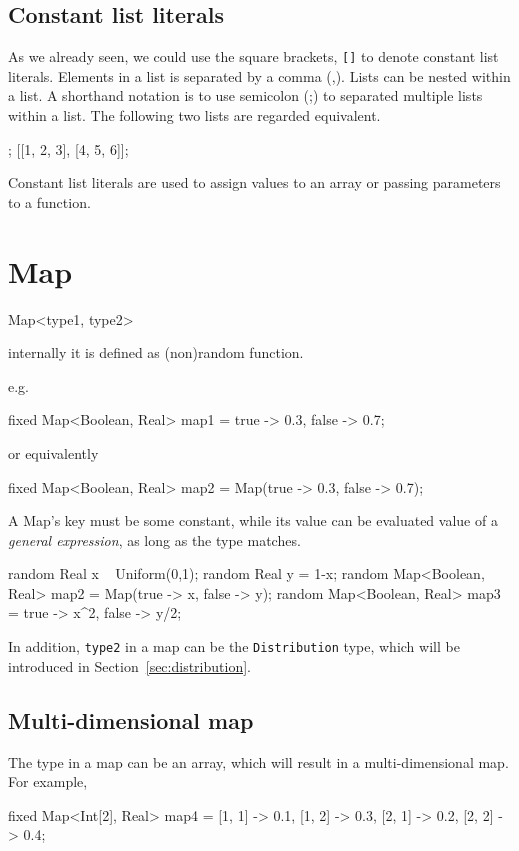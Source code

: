 \documentclass[12pt]{article}
\begin{document}
\subsection{Constant list literals}
As we already seen, we could use the square brackets, \texttt{[]} to denote constant list literals.
Elements in a list is separated by a comma (,). Lists can be nested within a list. A shorthand notation is to use semicolon (;) to separated multiple lists within a list.
The following two lists are regarded equivalent.
\begin{blog}
[1, 2, 3; 4, 5, 6];
[[1, 2, 3], [4, 5, 6]];
\end{blog}

Constant list literals are used to assign values to an array or passing parameters to a function.

\section{Map}
\begin{blog}
Map<type1, type2>
\end{blog}
internally it is defined as (non)random function.

e.g. 
\begin{blog}
fixed Map<Boolean, Real> map1 = {true -> 0.3, false -> 0.7};
\end{blog}
or equivalently 
\begin{blog}
fixed Map<Boolean, Real> map2 = Map(true -> 0.3, false -> 0.7);
\end{blog}

A Map's key must be some constant, while its value can be evaluated value of a \emph{general expression}, as long as the type matches.
\begin{blog}
random Real x ~ Uniform(0,1);
random Real y = 1-x;
random Map<Boolean, Real> map2 = Map(true -> x, false -> y);
random Map<Boolean, Real> map3 = {true -> x^2, false -> y/2};
\end{blog}

In addition, \texttt{type2}  in a map can be the \texttt{Distribution} type, which will be introduced in Section~\ref{sec:distribution}.

\subsection{Multi-dimensional map}
The type in a map can be an array, which will result in a multi-dimensional map.
For example,
\begin{blog}
fixed Map<Int[2], Real> map4 = 
    {[1, 1] -> 0.1, [1, 2] -> 0.3, [2, 1] -> 0.2, [2, 2] -> 0.4};
\end{blog}
\end{document}
